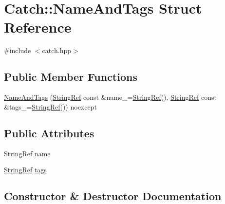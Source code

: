\hypertarget{struct_catch_1_1_name_and_tags}{}\section{Catch\+:\+:Name\+And\+Tags Struct Reference}
\label{struct_catch_1_1_name_and_tags}


{\ttfamily \#include $<$catch.\+hpp$>$}

\subsection*{Public Member Functions}
\begin{DoxyCompactItemize}
\item 
\mbox{\hyperlink{struct_catch_1_1_name_and_tags_ab585111e615ce8c504a2b9630de8ee94}{Name\+And\+Tags}} (\mbox{\hyperlink{class_catch_1_1_string_ref}{String\+Ref}} const \&name\+\_\+=\mbox{\hyperlink{class_catch_1_1_string_ref}{String\+Ref}}(), \mbox{\hyperlink{class_catch_1_1_string_ref}{String\+Ref}} const \&tags\+\_\+=\mbox{\hyperlink{class_catch_1_1_string_ref}{String\+Ref}}()) noexcept
\end{DoxyCompactItemize}
\subsection*{Public Attributes}
\begin{DoxyCompactItemize}
\item 
\mbox{\hyperlink{class_catch_1_1_string_ref}{String\+Ref}} \mbox{\hyperlink{struct_catch_1_1_name_and_tags_a7cbea60e0cebfa622c667008eb011420}{name}}
\item 
\mbox{\hyperlink{class_catch_1_1_string_ref}{String\+Ref}} \mbox{\hyperlink{struct_catch_1_1_name_and_tags_a74062ed1138834a348424eb7ed900c57}{tags}}
\end{DoxyCompactItemize}


\subsection{Constructor \& Destructor Documentation}
\mbox{\label{struct_catch_1_1_name_and_tags_ab585111e615ce8c504a2b9630de8ee94}} 
